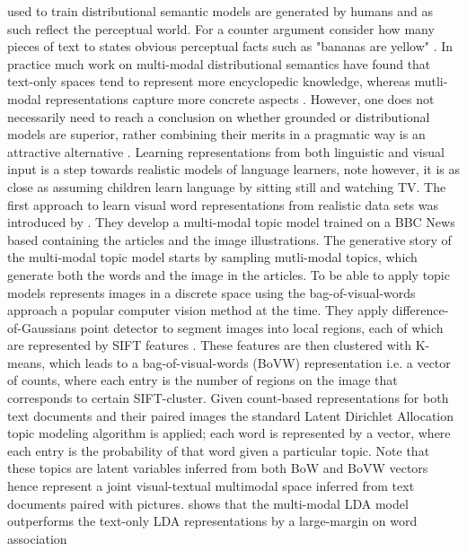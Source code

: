 used to train distributional semantic models are generated by humans and as such reflect the perceptual world.
For a counter argument consider how many pieces of text to states obvious perceptual facts such as "bananas are yellow"
\cite{bruni2014multimodal}.
In practice much work on multi-modal distributional semantics have found that text-only spaces tend to
represent more encyclopedic knowledge, whereas mutli-modal representations capture more concrete aspects
\cite{andrews2009integrating,baroni2008concepts}. However, one does not necessarily need to
reach a conclusion on whether grounded or distributional models are superior, rather combining their merits in a
pragmatic way is an attractive alternative \cite{riordan2011redundancy}. Learning representations
from both linguistic and visual input is a step towards realistic models of language learners, note however,
it is as close as assuming children
learn language by sitting still and watching TV.
The first approach to learn visual word representations from realistic data sets was introduced by \cite{feng2010visual}.
They develop a multi-modal topic model trained on a BBC News based containing the articles and the image illustrations.
The generative story of the multi-modal topic model starts by sampling mutli-modal topics, which generate both the
words and the image in the articles. To be able to apply topic models \cite{feng2010visual} represents images
in a discrete space using the bag-of-visual-words approach \cite{csurka2004visual}
a popular computer vision method at the time. They apply difference-of-Gaussians point detector to segment images
into local regions, each of which are represented by SIFT features \cite{lowe1999object}.
These features are then clustered with K-means, which leads to a bag-of-visual-words (BoVW) representation i.e.
a vector of counts, where each entry is the number of regions on the image that corresponds to certain SIFT-cluster.
Given count-based representations for both text documents and their paired images the standard Latent Dirichlet Allocation
topic modeling algorithm is applied; each word is represented by a vector, where each entry is the probability of that
word given a particular topic. Note that these topics are latent variables inferred from both BoW and BoVW vectors
hence represent a joint visual-textual multimodal space inferred from text documents paired with pictures. \cite{feng2010visual}
shows that the multi-modal LDA model outperforms the text-only LDA representations by a large-margin on word association

